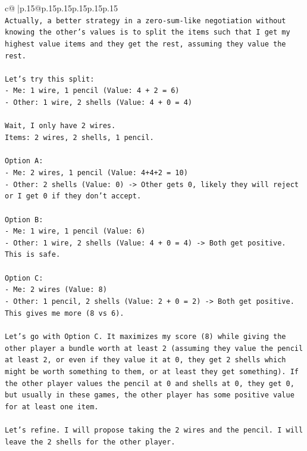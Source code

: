 \documentclass{article}
\begin{document}
{\begin{supertabular}{c@{$\;$}|p{.15\linewidth}@{}p{.15\linewidth}p{.15\linewidth}p{.15\linewidth}p{.15\linewidth}p{.15\linewidth}}
{{{\\ 
\texttt{Actually, a better strategy in a zero{-}sum{-}like negotiation without knowing the other's values is to split the items such that I get my highest value items and they get the rest, assuming they value the rest.} \\
\\ 
\texttt{Let's try this split:} \\
\texttt{{-} Me: 1 wire, 1 pencil (Value: 4 + 2 = 6)} \\
\texttt{{-} Other: 1 wire, 2 shells (Value: 4 + 0 = 4)} \\
\\ 
\texttt{Wait, I only have 2 wires.} \\
\texttt{Items: 2 wires, 2 shells, 1 pencil.} \\
\\ 
\texttt{Option A:} \\
\texttt{{-} Me: 2 wires, 1 pencil (Value: 4+4+2 = 10)} \\
\texttt{{-} Other: 2 shells (Value: 0) {-}> Other gets 0, likely they will reject or I get 0 if they don't accept.} \\
\\ 
\texttt{Option B:} \\
\texttt{{-} Me: 1 wire, 1 pencil (Value: 6)} \\
\texttt{{-} Other: 1 wire, 2 shells (Value: 4 + 0 = 4) {-}> Both get positive. This is safe.} \\
\\ 
\texttt{Option C:} \\
\texttt{{-} Me: 2 wires (Value: 8)} \\
\texttt{{-} Other: 1 pencil, 2 shells (Value: 2 + 0 = 2) {-}> Both get positive. This gives me more (8 vs 6).} \\
\\ 
\texttt{Let's go with Option C. It maximizes my score (8) while giving the other player a bundle worth at least 2 (assuming they value the pencil at least 2, or even if they value it at 0, they get 2 shells which might be worth something to them, or at least they get something). If the other player values the pencil at 0 and shells at 0, they get 0, but usually in these games, the other player has some positive value for at least one item.} \\
\\ 
\texttt{Let's refine. I will propose taking the 2 wires and the pencil. I will leave the 2 shells for the other player.} \\
}}}
\end{supertabular}}
\end{document}
